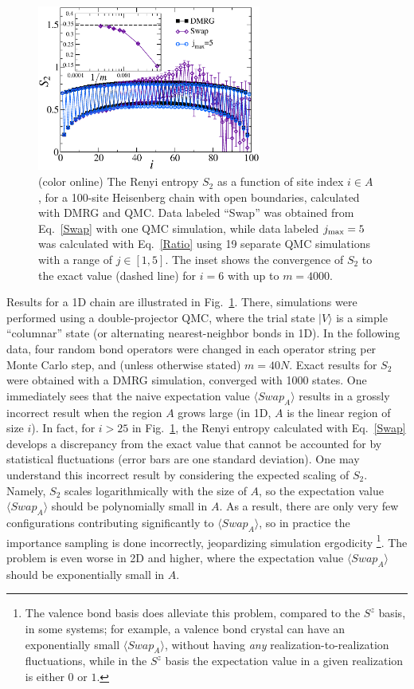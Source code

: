 \documentclass[prl,aps,twocolumn,floatfix,amsmath,amssymb,superscriptaddress,tightenlines]{revtex4}
\begin{document}
\begin{figure} {
\includegraphics[width=2.9in]{L100_fig2.eps} \caption{(color online) 
\label{1Dfig}
The Renyi entropy $S_2$ as a function of site index $i \in A$, for a 100-site Heisenberg chain with open boundaries, 
calculated with DMRG and QMC.  Data labeled ``Swap'' was obtained from Eq.~\eqref{Swap} with one QMC simulation, while
data labeled $j_{\rm max}=5$ was calculated with Eq.~\eqref{Ratio} using 19 separate QMC simulations with a range of  $j \in [1,5]$.  The inset shows the convergence of $S_2$ to the exact value (dashed line) for $i=6$ with up to $m=4000$.
}
} \end{figure}

Results for a 1D chain are illustrated in Fig.~\ref{1Dfig}.  There, simulations were performed using a double-projector QMC,  where
the trial state $| V \rangle$ is a simple ``columnar'' state (or alternating nearest-neighbor bonds in 1D).  In the following data, four random bond operators were changed in each operator string per Monte Carlo step, and (unless otherwise
stated) $m=40N$.  Exact results for $S_2$ were obtained with a DMRG simulation, converged with 1000 states.  One 
immediately sees that the naive expectation value $\langle Swap_A \rangle$ results in a grossly incorrect result when the region
$A$ grows large (in 1D, $A$ is the linear region of size $i$).   
In fact, for $i > 25$ in Fig.~\ref{1Dfig}, the Renyi entropy calculated with Eq.~\eqref{Swap} develops a discrepancy from the
exact value that cannot be accounted for by statistical fluctuations (error bars are one standard deviation).  
One may understand this incorrect result by considering the expected scaling of $S_2$.  Namely,
$S_2$ scales logarithmically with the size of $A$, so the expectation value
$\langle Swap_A \rangle$ should be polynomially small in $A$.  As a result, there
are only very
few configurations contributing significantly to $\langle Swap_A \rangle$, so in practice the importance  sampling is done incorrectly,
jeopardizing simulation ergodicity \footnote{The valence bond basis does alleviate this problem, compared to the
$S^z$ basis, in some systems; for example, a valence
bond crystal can have an exponentially small $\langle Swap_A \rangle$, without having {\it any} realization-to-realization fluctuations,
while in the $S^z$ basis the expectation value  in a given realization is either $0$ or $1$.}.
The problem is even worse in 2D and higher, where the expectation value 
$\langle Swap_A \rangle$ should be exponentially small in $A$.
\end{document}
